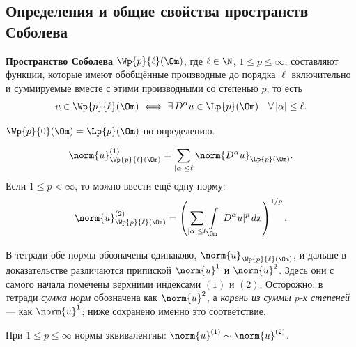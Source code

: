 
\subsection{Определения и общие свойства пространств Соболева}

\begin{definition}
\textbf{Пространство Соболева} $\Wp{p}{\ell}(\Om)$, где $\ell \in \N$, $1 \le p \le \infty$,
составляют функции, которые имеют обобщённые производные до порядка $\ell$ включительно
и суммируемые вместе с этими производными со степенью $p$, то есть
\[
  u \in \Wp{p}{\ell}(\Om) \iff \exists\, D^\alpha u \in \Lp{p}(\Om)
  \quad \forall\, |\alpha| \le \ell .
\]
\end{definition}

\begin{remark}
$\Wp{p}{0}(\Om) = \Lp{p}(\Om)$ по определению.
\end{remark}

\begin{definition}
\[
  \norm{u}^{(1)}_{\Wp{p}{\ell}(\Om)}
  = \sum_{|\alpha| \le \ell} \norm{D^\alpha u}_{\Lp{p}(\Om)} .
\]
Если $1 \le p < \infty$, то можно ввести ещё одну норму:
\[
  \norm{u}^{(2)}_{\Wp{p}{\ell}(\Om)}
  = \left( \sum_{|\alpha| \le \ell} \int\limits_\Om |D^\alpha u|^p\, dx \right)^{1/p} .
\]
\end{definition}

\begin{warn}
В тетради обе нормы обозначены одинаково, $\norm{u}_{\Wp{p}{\ell}(\Om)}$, и дальше
в доказательстве различаются припиской $\norm{u}^1$ и $\norm{u}^2$. Здесь они с самого
начала помечены верхними индексами $(1)$ и $(2)$. Осторожно: в тетради
\emph{сумма норм} обозначена как $\norm{u}^2$, а \emph{корень из суммы $p$-х степеней} —
как $\norm{u}^1$; ниже сохранено именно это соответствие.
\end{warn}

\begin{proposition}\label{prop:norm-equiv}
При $1 \le p \le \infty$ нормы эквивалентны: $\norm{u}^{(1)} \sim \norm{u}^{(2)}$.
\end{proposition}

